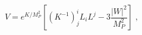 \begin{equation}
\label{eq:SUGRApot}
V = e^{K/M_P^2} \left[(K^{-1})^i_j L_i L^j - 3
\frac{|W|^2}{M_P^2}\right] \;, 
\end{equation} 
